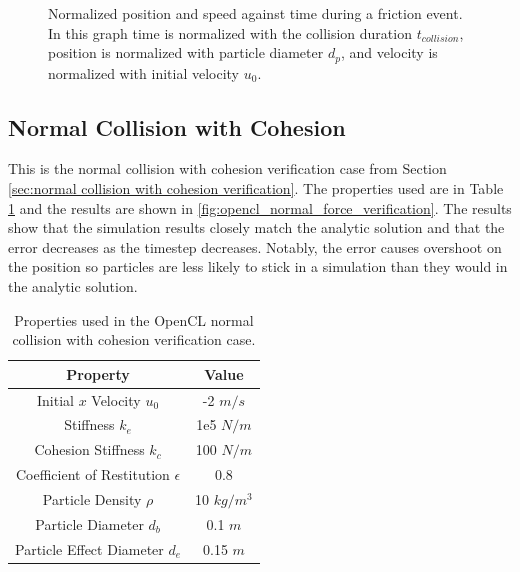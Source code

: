 \documentclass[a4paper,11pt,titlepage]{report}
\begin{document}
\begin{figure}[!htb]
\caption{Normalized position and speed against time during a friction event. In this graph time is normalized with the collision duration $t_{collision}$, position is normalized with particle diameter $d_p$, and velocity is normalized with initial velocity $u_0$.}
\label{fig:opencl_friction_verification}
\end{figure}
\subsection{Normal Collision with Cohesion}
This is the normal collision with cohesion verification case from Section \ref{sec:normal collision with cohesion verification}. The properties used are in Table \ref{tab:opencl normal collision with cohesion properties} and the results are shown in \ref{fig:opencl_normal_force_verification}. The results show that the simulation results closely match the analytic solution and that the error decreases as the timestep decreases. Notably, the error causes overshoot on the position so particles are less likely to stick in a simulation than they would in the analytic solution.
\begin{table}[!htb]
\centering
\begin{tabular}{| c c |}
\hline
Property & Value\\
\hline
Initial $x$ Velocity $u_0$ & -2 $m/s$ \\
Stiffness $k_e$ & 1e5 $N/m$ \\
Cohesion Stiffness $k_c$ & 100 $N/m$ \\
Coefficient of Restitution $\epsilon$ & 0.8 \\
Particle Density $\rho$ & 10 $kg/m^3$ \\
Particle Diameter $d_b$ & 0.1 $m$ \\
Particle Effect Diameter $d_e$ & 0.15 $m$ \\
\hline
\end{tabular}
\caption{Properties used in the OpenCL normal collision with cohesion verification case.}
\label{tab:opencl normal collision with cohesion properties}
\end{table}
\end{document}
